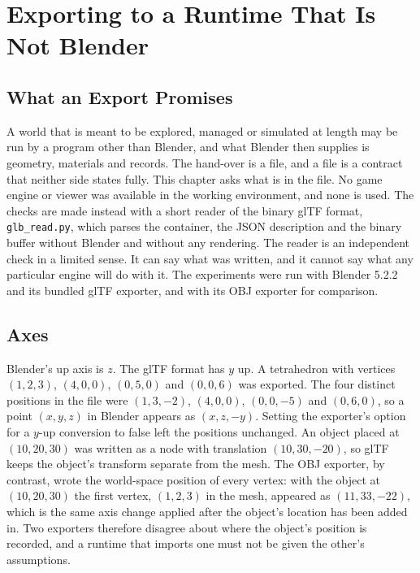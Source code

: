 \chapter{Exporting to a Runtime That Is Not Blender}

\section{What an Export Promises}

A world that is meant to be explored, managed or simulated at length may be run by a program other than Blender, and what Blender then supplies is geometry, materials and records. The hand-over is a file, and a file is a contract that neither side states fully. This chapter asks what is in the file. No game engine or viewer was available in the working environment, and none is used. The checks are made instead with a short reader of the binary glTF format, \texttt{glb\_read.py}, which parses the container, the JSON description and the binary buffer without Blender and without any rendering. The reader is an independent check in a limited sense. It can say what was written, and it cannot say what any particular engine will do with it. The experiments were run with Blender 5.2.2 and its bundled glTF exporter, and with its OBJ exporter for comparison.



\section{Axes}

Blender's up axis is $z$. The glTF format has $y$ up. A tetrahedron with vertices $(1,2,3)$, $(4,0,0)$, $(0,5,0)$ and $(0,0,6)$ was exported. The four distinct positions in the file were $(1,3,-2)$, $(4,0,0)$, $(0,0,-5)$ and $(0,6,0)$, so a point $(x,y,z)$ in Blender appears as $(x,z,-y)$. Setting the exporter's option for a $y$-up conversion to false left the positions unchanged. An object placed at $(10,20,30)$ was written as a node with translation $(10,30,-20)$, so glTF keeps the object's transform separate from the mesh. The OBJ exporter, by contrast, wrote the world-space position of every vertex: with the object at $(10,20,30)$ the first vertex, $(1,2,3)$ in the mesh, appeared as $(11,33,-22)$, which is the same axis change applied after the object's location has been added in. Two exporters therefore disagree about where the object's position is recorded, and a runtime that imports one must not be given the other's assumptions.

